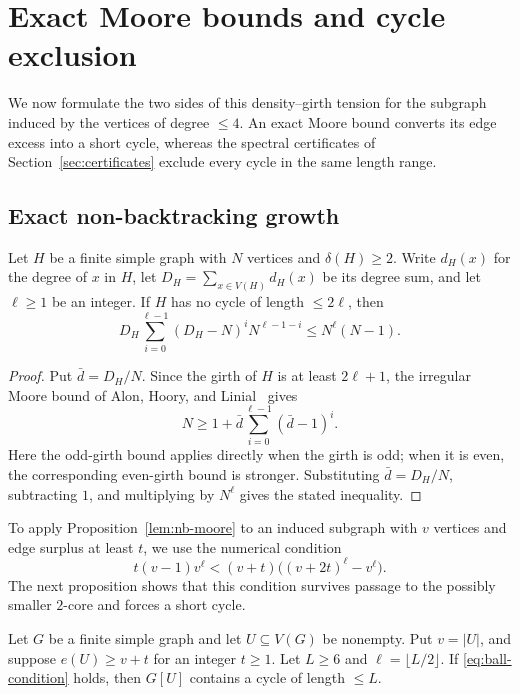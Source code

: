 \section{Exact Moore bounds and cycle exclusion}\label{sec:cycles}

We now formulate the two sides of this density--girth tension for the subgraph
induced by the vertices of degree \(\le4\).  An exact Moore bound converts its
edge excess into a short cycle, whereas the spectral certificates of
Section~\ref{sec:certificates} exclude every cycle in the same length range.

\subsection{Exact non-backtracking growth}

\begin{proposition}\label{lem:nb-moore}
Let \(H\) be a finite simple graph with \(N\) vertices and \(\delta(H)\ge2\).
Write \(d_H(x)\) for the degree of \(x\) in \(H\), let
\(D_H=\sum_{x\in V(H)}d_H(x)\) be its degree sum, and let \(\ell\ge1\) be an
integer.  If \(H\) has no cycle of length \(\le2\ell\), then
\[
 D_H\sum_{i=0}^{\ell-1}(D_H-N)^iN^{\ell-1-i}\le N^\ell(N-1).
\]
\end{proposition}

\begin{proof}
Put \(\bar d=D_H/N\).  Since the girth of \(H\) is at least
\(2\ell+1\), the irregular Moore bound of Alon, Hoory, and
Linial~\cite{ahl2002} gives
\[
 N\ge 1+\bar d\sum_{i=0}^{\ell-1}(\bar d-1)^i.
\]
Here the odd-girth bound applies directly when the girth is odd; when it is
even, the corresponding even-girth bound is stronger.  Substituting
\(\bar d=D_H/N\), subtracting \(1\), and multiplying by \(N^\ell\) gives the
stated inequality.
\end{proof}

To apply Proposition~\ref{lem:nb-moore} to an induced subgraph with \(v\)
vertices and edge surplus at least \(t\), we use the numerical condition
\begin{equation}\label{eq:ball-condition}
 t(v-1)v^\ell<(v+t)\bigl((v+2t)^\ell-v^\ell\bigr).
\end{equation}
The next proposition shows that this condition survives passage to the
possibly smaller \(2\)-core and forces a short cycle.

\begin{proposition}\label{prop:nb-induced-cycle}
Let \(G\) be a finite simple graph and let \(U\subseteq V(G)\) be nonempty.
Put \(v=|U|\), and suppose \(e(U)\ge v+t\) for an integer \(t\ge1\).  Let \(L\ge6\) and
\(\ell=\lfloor L/2\rfloor\).  If \eqref{eq:ball-condition} holds, then
\(G[U]\) contains a cycle of length \(\le L\).
\end{proposition}

